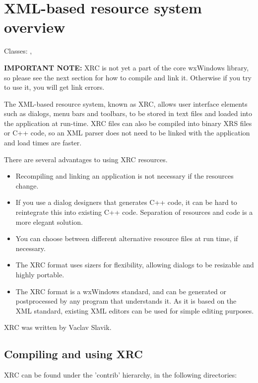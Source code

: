 \section{XML-based resource system overview}\label{xrcoverview}

Classes: , 

{\bf IMPORTANT NOTE:} XRC is not yet a part of the core wxWindows library, so
please see the next section for how to compile and link it. Otherwise if you
try to use it, you will get link errors.

The XML-based resource system, known as XRC, allows user interface elements such as
dialogs, menu bars and toolbars, to be stored in text files and loaded into
the application at run-time. XRC files can also be compiled into binary XRS files or C++
code, so an XML parser does not need to be linked with the application and load times
are faster.

There are several advantages to using XRC resources.

\begin{itemize}\itemsep=0pt
\item Recompiling and linking an application is not necessary if the
resources change.
\item If you use a dialog designers that generates C++ code, it can be hard
to reintegrate this into existing C++ code. Separation of resources and code
is a more elegant solution.
\item You can choose between different alternative resource files at run time, if necessary.
\item The XRC format uses sizers for flexibility, allowing dialogs to be resizable
and highly portable.
\item The XRC format is a wxWindows standard,
and can be generated or postprocessed by any program that understands it. As it is based
on the XML standard, existing XML editors can be used for simple editing purposes.
\end{itemize}

XRC was written by Vaclav Slavik.

\subsection{Compiling and using XRC}\label{compilingxrc}

XRC can be found under the 'contrib' hierarchy, in the following directories:

